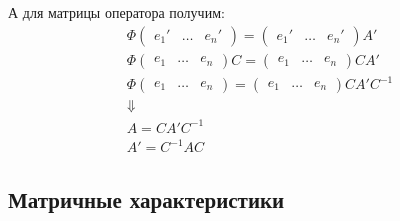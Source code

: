 А для матрицы оператора получим:
\begin{gather*}
    \Phi
    \begin{pmatrix}
        e_1' & \ldots & e_n'
    \end{pmatrix}
    =
    \begin{pmatrix}
        e_1' & \ldots & e_n'
    \end{pmatrix}
    A'
    \\
    \Phi
    \begin{pmatrix}
        e_1 & \ldots & e_n
    \end{pmatrix}
    C
    =
    \begin{pmatrix}
        e_1 & \ldots & e_n
    \end{pmatrix}
    C A'
    \\
    \Phi
    \begin{pmatrix}
        e_1 & \ldots & e_n
    \end{pmatrix}
    =
    \begin{pmatrix}
        e_1 & \ldots & e_n
    \end{pmatrix}
    C A' C^{-1}
    \\
    \Downarrow
    \\
    A = C A' C^{-1}
    \\
    A' = C^{-1} A C
\end{gather*}

\subsection{Матричные характеристики}

